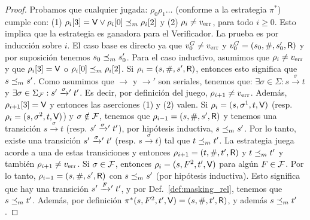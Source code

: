 \begin{proof}
	Probamos que cualquier jugada: $\rho_0 \rho_1 \dots$ (conforme a la estrategia $\pi^*$) cumple con: 
	(1) $\pr{3}{\rho_i}=\Verifier \vee \pr{0}{\rho_i} \Masking \pr{2}{\rho_i}$ y 
	(2) $\rho_i \neq \ErrorSt$, para todo $i\geq 0$. Esto implica que la estrategia es ganadora para el Verificador. 
La prueba es por inducción sobre $i$. El caso base es directo ya que 
$\InitVertex^G \neq \ErrorSt$ y $\InitVertex^G = (\InitState, \#, \InitStatePrime, \Refuter)$ y por suposición tenemos $\InitState \Masking \InitStatePrime$. Para el caso inductivo, asumimos que 
$\rho_i \neq \ErrorSt$ y que $\pr{3}{\rho_i} = \Verifier$ o $\pr{0}{\rho_i} \Masking \pr{2}{\rho_i}$. 
Si $\rho_i = (s, \#, s', \Refuter)$, entonces esto significa que $s \Masking s'$. Como asumimos que
$\rightarrow$ y $\rightarrow'$ son seriales, tenemos que: $\exists \sigma \in \Sigma: s \xrightarrow{\sigma} t$ y $\exists \sigma \in \SigmaF : s' \xrightarrowprime{\sigma} t'$. Es decir, por definición del juego, $\rho_{i+1} \neq \ErrorSt$. 
Además, $\pr{3}{\rho_{i+1}} = \Verifier$ y entonces las aserciones (1) y (2) valen. 
Si $\rho_i = (s, \sigma^1, t, \Verifier)$ (resp. $\rho_i = (s, \sigma^2, t, \Verifier)$) y $\sigma \notin \Faults$,
tenemos que $\rho_{i-1} = (s, \#, s', \Refuter)$ y tenemos una transición $s \xrightarrow{\sigma} t$ (resp. $s' \xrightarrowprime{\sigma} t'$), por hipótesis inductiva, $s \Masking s'$. 
Por lo tanto, existe una transición $s' \xrightarrowprime{\sigma} t'$ (resp.  $s \xrightarrow{\sigma} t$) tal que $t \Masking t'$. 
La estrategia juega acorde a una de estas transiciones y entonces
$\rho_{i+1} = (t, \#, t', \Refuter)$ y $t \Masking t'$ y también $\rho_{i+1} \neq \ErrorSt$. Si $\sigma \in \Faults$, entonces $\rho_i = (s, F^2, t', \Verifier)$ para algún $F \in \Faults$. 
Por lo tanto, $\rho_{i-1} = (s, \#, s', \Refuter)$ con $s \Masking s'$ (por hipótesis inductiva). Esto significa que hay una transición $s' \xrightarrowprime{F} t'$, y por Def.~\ref{def:masking_rel},
tenemos que $s \Masking t'$. Además, por definición $\pi^*(s, F^2, t', \Verifier) = (s, \#,t',\Refuter)$, 
y además $s \Masking t'$. 


\end{proof}
